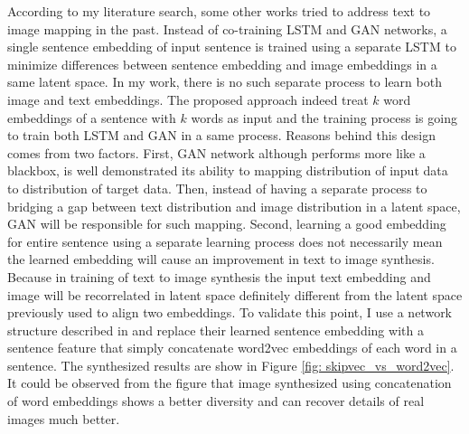 \documentclass{iitthesis}
\begin{document}
According to my literature search, some other works \cite{DBLP:journals/corr/DongZMG17}\cite{reed2016generative}\cite{zhang2016stackgan} tried to address text to image mapping in the past. Instead of co-training LSTM and GAN networks, a single sentence embedding of input sentence is trained using a separate LSTM to minimize differences between sentence embedding and image embeddings in a same latent space. In my work, there is no such separate process to learn both image and text embeddings. The proposed approach indeed treat $k$ word embeddings of a sentence with $k$ words as input and the training process is going to train both LSTM and GAN in a same process. Reasons behind this design comes from two factors. First, GAN network although performs more like a blackbox, is well demonstrated its ability to mapping distribution of input data to distribution of target data. Then, instead of having a separate process to bridging a gap between text distribution and image distribution in a latent space, GAN will be responsible for such mapping. Second, learning a good embedding for entire sentence using a separate learning process does not necessarily mean the learned embedding will cause an improvement in text to image synthesis. Because in training of text to image synthesis the input text embedding and image will be recorrelated in latent space definitely different from the latent space previously used to align two embeddings. To validate this point, I use a network structure described in \cite{reed2016generative} and replace their learned sentence embedding with a sentence feature that simply concatenate word2vec embeddings of each word in a sentence. The synthesized results are show in Figure \ref{fig: skipvec_vs_word2vec}. It could be observed from the figure that image synthesized using concatenation of word embeddings shows a better diversity and can recover details of real images much better. 
\end{document}
